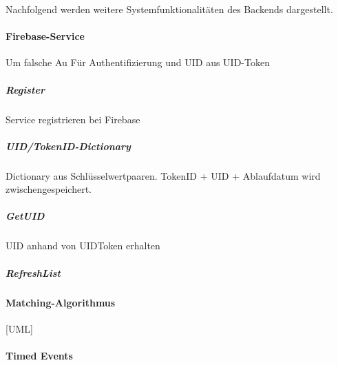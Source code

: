                  
Nachfolgend werden weitere Systemfunktionalitäten des Backends dargestellt.

\paragraph{Firebase-Service}
Um falsche Au
Für Authentifizierung und UID aus UID-Token

\subparagraph{Register}
Service registrieren bei Firebase

\subparagraph{UID/TokenID-Dictionary}
Dictionary aus Schlüsselwertpaaren. TokenID + UID + Ablaufdatum wird zwischengespeichert.

\subparagraph{GetUID}
UID anhand von UIDToken erhalten

\subparagraph{RefreshList}

\paragraph{Matching-Algorithmus}

[UML]

\paragraph{Timed Events}